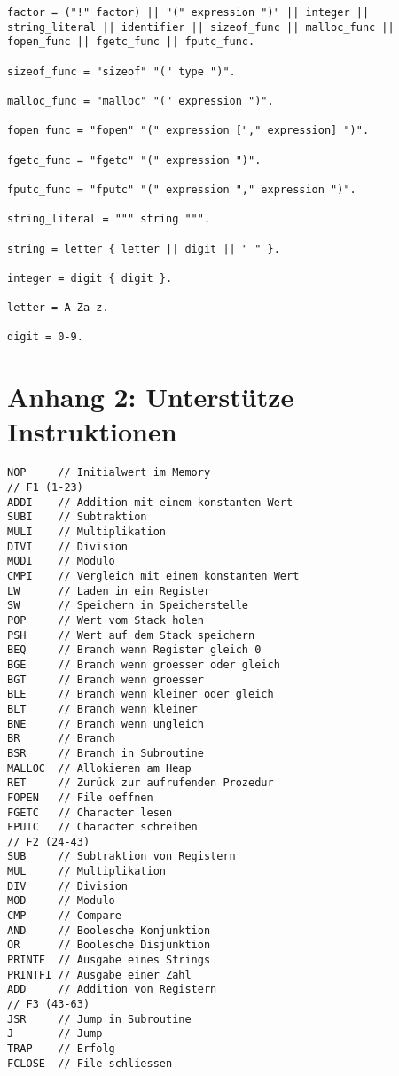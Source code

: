 \documentclass[a4paper,12pt]{article}
\begin{document}
\begin{lstlisting}
factor = ("!" factor) || "(" expression ")" || integer || 
string_literal || identifier || sizeof_func || malloc_func ||
fopen_func || fgetc_func || fputc_func.

sizeof_func = "sizeof" "(" type ")".

malloc_func = "malloc" "(" expression ")".

fopen_func = "fopen" "(" expression ["," expression] ")".

fgetc_func = "fgetc" "(" expression ")".

fputc_func = "fputc" "(" expression "," expression ")".

string_literal = """ string """.

string = letter { letter || digit || " " }.

integer = digit { digit }.

letter = A-Za-z.

digit = 0-9.
	\end{lstlisting}

	\newpage
	\section{Anhang 2: Unterstütze Instruktionen}
	\begin{lstlisting}
NOP 	// Initialwert im Memory
// F1 (1-23)
ADDI	// Addition mit einem konstanten Wert
SUBI	// Subtraktion
MULI	// Multiplikation
DIVI	// Division
MODI	// Modulo
CMPI	// Vergleich mit einem konstanten Wert
LW  	// Laden in ein Register
SW  	// Speichern in Speicherstelle
POP 	// Wert vom Stack holen
PSH 	// Wert auf dem Stack speichern
BEQ 	// Branch wenn Register gleich 0
BGE 	// Branch wenn groesser oder gleich
BGT 	// Branch wenn groesser
BLE 	// Branch wenn kleiner oder gleich
BLT 	// Branch wenn kleiner
BNE 	// Branch wenn ungleich
BR  	// Branch
BSR 	// Branch in Subroutine
MALLOC 	// Allokieren am Heap
RET 	// Zurück zur aufrufenden Prozedur
FOPEN 	// File oeffnen
FGETC 	// Character lesen
FPUTC 	// Character schreiben
// F2 (24-43)
SUB 	// Subtraktion von Registern
MUL 	// Multiplikation
DIV 	// Division
MOD 	// Modulo
CMP 	// Compare
AND 	// Boolesche Konjunktion
OR  	// Boolesche Disjunktion
PRINTF 	// Ausgabe eines Strings
PRINTFI // Ausgabe einer Zahl
ADD 	// Addition von Registern
// F3 (43-63)
JSR 	// Jump in Subroutine
J   	// Jump
TRAP 	// Erfolg
FCLOSE 	// File schliessen
	\end{lstlisting}
\end{document}
